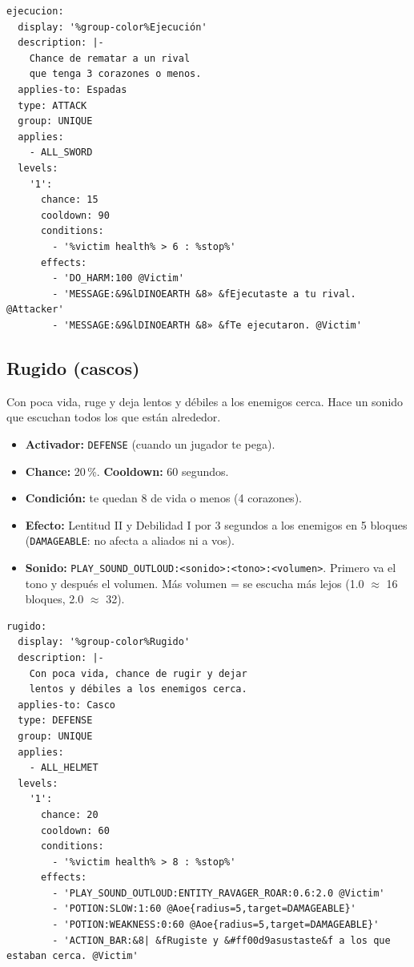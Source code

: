 \documentclass[11pt,a4paper]{article}
\newcommand{\tr}[1]{\texttt{\small #1}}           %
\begin{document}
\begin{Verbatim}[frame=single,fontsize=\small,framesep=3mm]
ejecucion:
  display: '%group-color%Ejecución'
  description: |-
    Chance de rematar a un rival
    que tenga 3 corazones o menos.
  applies-to: Espadas
  type: ATTACK
  group: UNIQUE
  applies:
    - ALL_SWORD
  levels:
    '1':
      chance: 15
      cooldown: 90
      conditions:
        - '%victim health% > 6 : %stop%'
      effects:
        - 'DO_HARM:100 @Victim'
        - 'MESSAGE:&9&lDINOEARTH &8» &fEjecutaste a tu rival. @Attacker'
        - 'MESSAGE:&9&lDINOEARTH &8» &fTe ejecutaron. @Victim'
\end{Verbatim}

\subsection{Rugido (cascos)}
Con poca vida, ruge y deja lentos y débiles a los enemigos cerca. Hace un sonido que escuchan todos los que
están alrededor.
\begin{itemize}[leftmargin=*,itemsep=0pt]
  \item \textbf{Activador:} \tr{DEFENSE} (cuando un jugador te pega).
  \item \textbf{Chance:} 20\,\%. \quad \textbf{Cooldown:} 60 segundos.
  \item \textbf{Condición:} te quedan 8 de vida o menos (4 corazones).
  \item \textbf{Efecto:} Lentitud II y Debilidad I por 3 segundos a los enemigos en 5 bloques (\tr{DAMAGEABLE}: no
        afecta a aliados ni a vos).
  \item \textbf{Sonido:} \tr{PLAY\_SOUND\_OUTLOUD:<sonido>:<tono>:<volumen>}. Primero va el tono y después el volumen.
        Más volumen = se escucha más lejos (1.0 $\approx$ 16 bloques, 2.0 $\approx$ 32).
\end{itemize}

\begin{Verbatim}[frame=single,fontsize=\small,framesep=3mm]
rugido:
  display: '%group-color%Rugido'
  description: |-
    Con poca vida, chance de rugir y dejar
    lentos y débiles a los enemigos cerca.
  applies-to: Casco
  type: DEFENSE
  group: UNIQUE
  applies:
    - ALL_HELMET
  levels:
    '1':
      chance: 20
      cooldown: 60
      conditions:
        - '%victim health% > 8 : %stop%'
      effects:
        - 'PLAY_SOUND_OUTLOUD:ENTITY_RAVAGER_ROAR:0.6:2.0 @Victim'
        - 'POTION:SLOW:1:60 @Aoe{radius=5,target=DAMAGEABLE}'
        - 'POTION:WEAKNESS:0:60 @Aoe{radius=5,target=DAMAGEABLE}'
        - 'ACTION_BAR:&8| &fRugiste y &#ff00d9asustaste&f a los que estaban cerca. @Victim'
\end{Verbatim}
\end{document}
